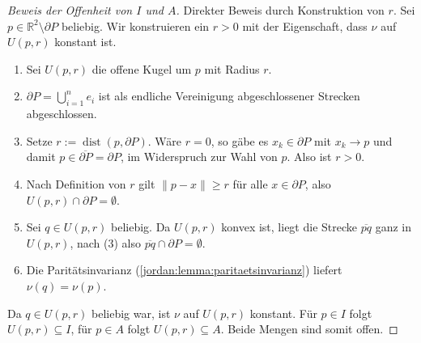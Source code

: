 
\begin{proof}[Beweis der Offenheit von $I$ und $A$\label{jordan:beweis:offenheit_innen_aussen}]
    Direkter Beweis durch Konstruktion von $r$. 
    Sei $p \in \mathbb{R}^2 \setminus \partial P$ beliebig. Wir konstruieren ein
    $r > 0$ mit der Eigenschaft, dass $\nu$ auf $U(p,r)$ konstant ist.

    \begin{enumerate}
        \item Sei $U(p,r)$ die offene Kugel um $p$ mit Radius $r$.

        \item $\partial P = \bigcup_{i=1}^{n} e_i$ ist als endliche Vereinigung
            abgeschlossener Strecken abgeschlossen.

        \item Setze $r := \operatorname{dist}(p, \partial P)$. Wäre $r = 0$, so gäbe
            es $x_k \in \partial P$ mit $x_k \to p$ und damit
            $p \in \overline{\partial P} = \partial P$, im Widerspruch zur Wahl
            von $p$. Also ist $r > 0$.

        \item Nach Definition von $r$ gilt $\lVert p - x \rVert \ge r$ für alle
            $x \in \partial P$, also $U(p,r) \cap \partial P = \emptyset$.

        \item Sei $q \in U(p,r)$ beliebig. Da $U(p,r)$ konvex ist, liegt die
            Strecke $\overline{pq}$ ganz in $U(p,r)$, nach (3) also
            $\overline{pq} \cap \partial P = \emptyset$.

        \item Die Paritätsinvarianz (\ref{jordan:lemma:paritaetsinvarianz}) liefert
            $\nu(q) = \nu(p)$.
\end{enumerate}

Da $q \in U(p,r)$ beliebig war, ist $\nu$ auf $U(p,r)$ konstant. Für
$p \in I$ folgt $U(p,r) \subseteq I$, für $p \in A$ folgt
$U(p,r) \subseteq A$. Beide Mengen sind somit offen.
\end{proof}
